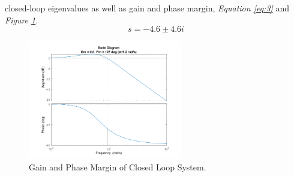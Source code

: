 \documentclass[10pt]{article}
\begin{document}
\begin{enumerate}[label=\textbf{\arabic*.}]
  closed-loop eigenvalues as well as gain and phase margin, \emph{Equation 
  \ref{eq:3}} and \emph{Figure \ref{fig:2}}.
  \begin{equation}
    s = -4.6 \pm 4.6i
    \label{eq:3}
  \end{equation}
  \begin{figure}[H]
    \centering
    \includegraphics[width=0.6\textwidth]{p1_bode.png}
    \caption{Gain and Phase Margin of Closed Loop System.}
    \label{fig:2}
  \end{figure}
  \vspace{12pt}


\end{enumerate}
\end{document}
